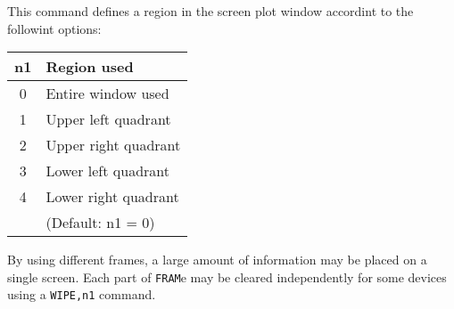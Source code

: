 \headb

This command defines a region in the screen plot window accordint to the
followint options:

\begin{center}
\begin{tabular}{c | l }
     n1  &  Region used \\ \hline
     0   &  Entire window used \\
     1   &  Upper left quadrant \\
     2   &  Upper right quadrant \\
     3   &  Lower left  quadrant \\
     4   &  Lower right quadrant \\
         &  (Default: n1 = 0)
\end{tabular}
\end{center}

By using different frames, a large amount of information may be
placed on a single screen.  Each part of {\tt FRAM}e may be cleared
independently for some devices using a {\tt WIPE,n1} command.
\vfill
\eject
